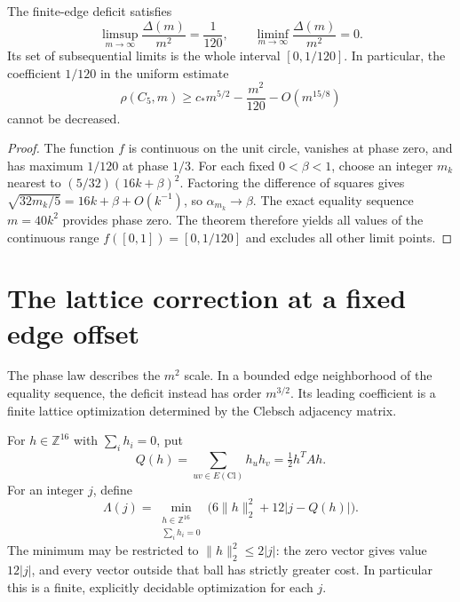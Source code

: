 \begin{corollary}
\label{cor:uniform-coefficient}
The finite-edge deficit satisfies
\[
 \limsup_{m\to\infty}\frac{\Delta(m)}{m^2}=\frac1{120},\qquad
 \liminf_{m\to\infty}\frac{\Delta(m)}{m^2}=0.
\]
Its set of subsequential limits is the whole interval $[0,1/120]$. In
particular, the coefficient $1/120$ in the uniform estimate
\[
 \rho(C_5,m)\geq c_\ast m^{5/2}-\frac{m^2}{120}-O(m^{15/8})
\]
cannot be decreased.
\end{corollary}
\begin{proof}
The function $f$ is continuous on the unit circle, vanishes at phase zero,
and has maximum $1/120$ at phase $1/3$. For each fixed $0<\beta<1$,
choose an integer $m_k$ nearest to $(5/32)(16k+\beta)^2$. Factoring the
difference of squares gives
$\sqrt{32m_k/5}=16k+\beta+O(k^{-1})$, so $\alpha_{m_k}\to\beta$.
The exact equality sequence $m=40k^2$ provides phase zero. The theorem
therefore yields all values of the continuous range
$f([0,1])=[0,1/120]$ and excludes all other limit points.
\end{proof}

\section{The lattice correction at a fixed edge offset}
\label{sec:lattice-offset}

The phase law describes the $m^2$ scale. In a bounded edge neighborhood
of the equality sequence, the deficit instead has order $m^{3/2}$. Its
leading coefficient is a finite lattice optimization determined by the
Clebsch adjacency matrix.

For $h\in\mathbb Z^{16}$ with $\sum_i h_i=0$, put
\[
 Q(h)=\sum_{uv\in E(\mathrm{Cl})}h_uh_v=\tfrac12h^TAh.
\]
For an integer $j$, define
\begin{equation}\tag{68}\label{eq:lattice-objective}
 \Lambda(j)=\min_{\substack{h\in\mathbb Z^{16}\\\sum_i h_i=0}}
 \bigl(6\lVert h\rVert_2^2+12|j-Q(h)|\bigr).
\end{equation}
The minimum may be restricted to $\lVert h\rVert_2^2\leq2|j|$: the zero
vector gives value $12|j|$, and every vector outside that ball has
strictly greater cost. In particular this is a finite, explicitly
decidable optimization for each $j$.

